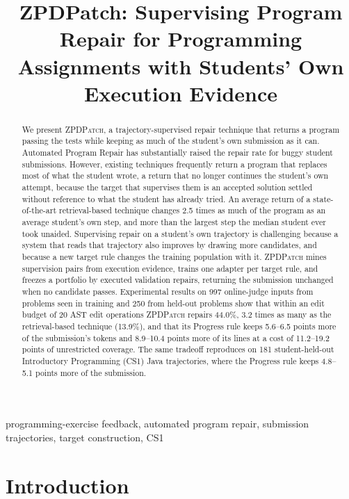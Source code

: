 \documentclass[10pt,conference]{IEEEtran}
\title{ZPDPatch: Supervising Program Repair for Programming Assignments with Students' Own Execution Evidence}
\author{}
\begin{document}
\maketitle
\begin{abstract}
We present \textsc{ZPDPatch}, a trajectory-supervised repair technique that returns a program passing the tests while keeping as much of the student's own submission as it can. Automated Program Repair has substantially raised the repair rate for buggy student submissions. However, existing techniques frequently return a program that replaces most of what the student wrote, a return that no longer continues the student's own attempt, because the target that supervises them is an accepted solution settled without reference to what the student has already tried. An average return of a state-of-the-art retrieval-based technique changes 2.5 times as much of the program as an average student's own step, and more than the largest step the median student ever took unaided. Supervising repair on a student's own trajectory is challenging because a system that reads that trajectory also improves by drawing more candidates, and because a new target rule changes the training population with it. \textsc{ZPDPatch} mines supervision pairs from execution evidence, trains one adapter per target rule, and freezes a portfolio by executed validation repairs, returning the submission unchanged when no candidate passes. Experimental results on 997 online-judge inputs from problems seen in training and 250 from held-out problems show that within an edit budget of 20 AST edit operations \textsc{ZPDPatch} repairs 44.0\%, 3.2 times as many as the retrieval-based technique (13.9\%), and that its Progress rule keeps 5.6--6.5 points more of the submission's tokens and 8.9--10.4 points more of its lines at a cost of 11.2--19.2 points of unrestricted coverage. The same tradeoff reproduces on 181 student-held-out Introductory Programming (CS1) Java trajectories, where the Progress rule keeps 4.8--5.1 points more of the submission.
\end{abstract}
\begin{IEEEkeywords}
programming-exercise feedback, automated program repair, submission trajectories, target construction, CS1
\end{IEEEkeywords}

\section{Introduction}
\label{sec:introduction}
\end{document}
